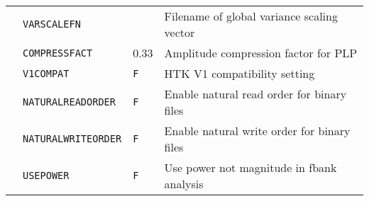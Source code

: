 \begin{center}
\begin{supertabular}{|p{1.8cm}|l|l|p{6.6cm}|}
  & \texttt{VARSCALEFN} &  & Filename of global variance scaling vector \\ 


  & \texttt{COMPRESSFACT} & 0.33 & Amplitude compression factor for PLP \\ \hline







   


  & \texttt{V1COMPAT} & \texttt{F} & HTK V1 compatibility setting \\ \hline

































  & \texttt{NATURALREADORDER} & \texttt{F} & Enable natural read order for binary files \\  




  & \texttt{NATURALWRITEORDER} & \texttt{F} & Enable natural write order for binary files \\ \hline







  & \texttt{USEPOWER}  & \texttt{F} & Use power not magnitude in fbank analysis \\ 



\end{supertabular}
\end{center}

